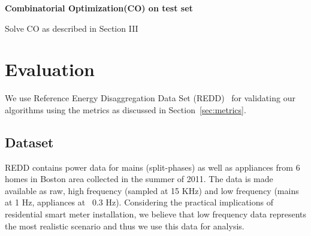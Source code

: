 \documentclass[conference]{IEEEtran}
\newcommand{\figref}[1]{Figure~\ref{#1}}
\newcommand{\secref}[1]{Section~\ref{#1}}
\newcommand{\indicns}{INDiC}
\begin{document}
\begin{algorithm}[ht!]
{}


\BlankLine
\textbf{Combinatorial Optimization(CO) on test set} \;
\BlankLine  
    
\nl Solve CO as described in Section III

\nl {}\;
\caption{\indicns-CO}
\label{algo:main}

\end{algorithm}


\vspace{-2mm}
\section{Evaluation}
\vspace{-2mm}

\noindent We use Reference Energy Disaggregation Data Set (REDD)~\cite{redd} for validating our algorithms using the metrics as discussed in \secref{sec:metrics}. %

\vspace{-3mm}
\subsection{Dataset}
\vspace{-1mm}
\noindent REDD contains power data for mains (split-phases) as well as appliances from 6 homes in Boston area collected in the summer of 2011. The data is made available as raw, high frequency (sampled at 15 KHz) and low frequency (mains at 1 Hz, appliances at ~0.3 Hz). Considering the practical implications of residential smart meter installation, we believe that low frequency data represents the most realistic scenario and thus we use this data for analysis. 

\end{document}
